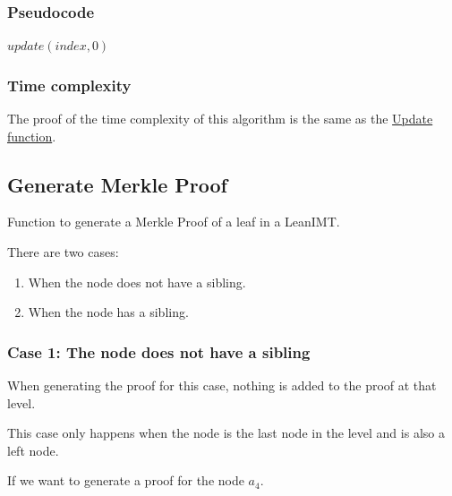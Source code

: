 \documentclass{article}
\begin{document}
\subsubsection{Pseudocode}

\begin{algorithm}[H]
    \caption{LeanIMT Remove algorithm}\label{remove}
    \begin{algorithmic}[1]
        \State $update(index, 0)$
        \EndProcedure
    \end{algorithmic}
\end{algorithm}


\subsubsection{Time complexity}

The proof of the time complexity of this algorithm is the same as the \hyperref[sec:update-time-complexity]{Update function}.


\subsection{Generate Merkle Proof}

Function to generate a Merkle Proof of a leaf in a LeanIMT.

There are two cases:

\begin{enumerate}
    \item When the node does not have a sibling.
    \item When the node has a sibling.
\end{enumerate}


\subsubsection*{Case 1: The node does not have a sibling}
\label{sec:case-1-generate-proof}

When generating the proof for this case, nothing is added to the proof at that level.

This case only happens when the node is the last node in the level and is also a left node.

If we want to generate a proof for the node $a_4$.
\end{document}

